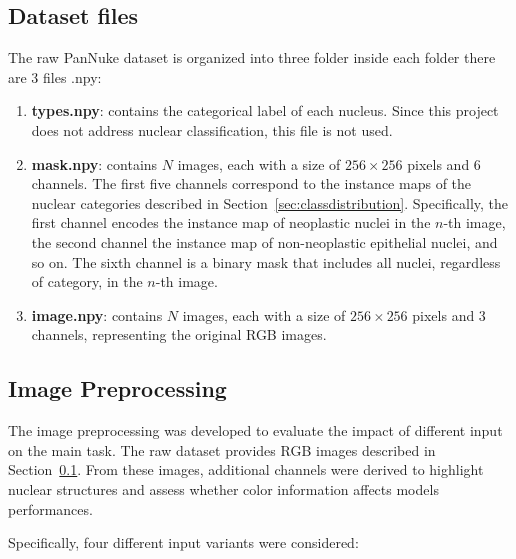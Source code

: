 \documentclass[target=bach,aauheader=,style=]{thud}
\begin{document}
\subsection{Dataset files}
\label{sec:datafiles}
The raw PanNuke dataset is organized into three folder inside each folder there are 3 files .npy:

\begin{enumerate}
    \item \textbf{types.npy}: contains the categorical label of each nucleus. Since this project does not address nuclear classification, this file is not used.
    
    \item \textbf{mask.npy}: contains $N$ images, each with a size of $256 \times 256$ pixels and 6 channels.  
    The first five channels correspond to the instance maps of the nuclear categories described in Section~\ref{sec:classdistribution}.  
    Specifically, the first channel encodes the instance map of neoplastic nuclei in the $n$-th image, the second channel the instance map of non-neoplastic epithelial nuclei, and so on.  
    The sixth channel is a binary mask that includes all nuclei, regardless of category, in the $n$-th image.
    
    \item \textbf{image.npy}: contains $N$ images, each with a size of $256 \times 256$ pixels and 3 channels, representing the original RGB images.
\end{enumerate}
\begin{center}
\end{center}
\subsection{Image Preprocessing}
The image preprocessing was developed to evaluate the impact of different input on the main task. 
The raw dataset provides RGB images described in Section~\ref{sec:datafiles}. 
From these images, additional channels were derived to highlight nuclear structures and assess whether color information affects models performances. 

Specifically, four different input variants were considered:
\end{document}

